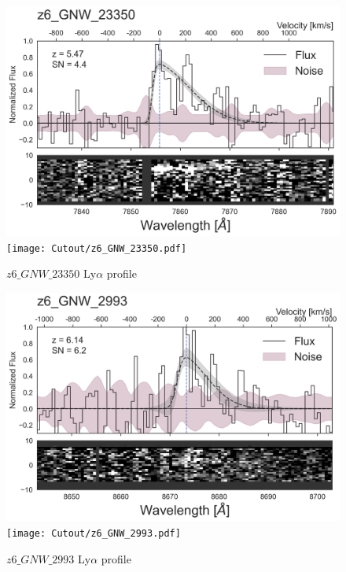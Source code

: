 \documentclass[12pt,english]{article}
\begin{document}
\clearpage
\begin{figure}
\begin{center}\includegraphics[width=12cm, trim=0.1cm 0cm 0cm -1cm]{LyaProfiles/z6_GNW_23350.png}
\texttt{[image: Cutout/z6\_GNW\_23350.pdf]}
\caption{$z6\_GNW\_23350$ Ly$\alpha$ profile}
\end{center}
\end{figure}
\clearpage
\begin{figure}
\begin{center}\includegraphics[width=12cm, trim=0.1cm 0cm 0cm -1cm]{LyaProfiles/z6_GNW_2993.png}
\texttt{[image: Cutout/z6\_GNW\_2993.pdf]}
\caption{$z6\_GNW\_2993$ Ly$\alpha$ profile}
\end{center}
\end{figure}
\clearpage
\end{document}
